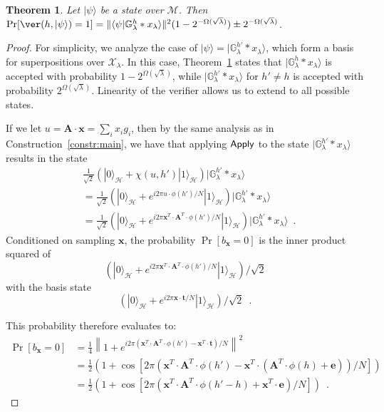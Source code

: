 \documentclass{article}\usepackage[a4paper,margin=20mm]{geometry}
\newtheorem{theorem}{Theorem}\newtheorem{lemma}[theorem]{Lemma}\newtheorem{proposition}[theorem]{Proposition}\newtheorem{corollary}[theorem]{Corollary}\newtheorem{definition}[theorem]{Definition}\newtheorem{claim}[theorem]{Claim}\newtheorem{remark}[theorem]{Remark}\newtheorem{observation}[theorem]{Observation}\newtheorem{conjecture}[theorem]{Conjecture}\newtheorem{example}[theorem]{Example}
\numberwithin{theorem}{section}
\numberwithin{equation}{section}
\newcommand{\G}{\mathbb{G}}
\newcommand{\ev}{{\mathbf{e}}}
\newcommand{\tv}{{\mathbf{t}}}
\newcommand{\xv}{{\mathbf{x}}}
\newcommand{\Am}{{\mathbf{A}}}
\newcommand{\Hs}{{\mathcal{H}}}
\newcommand{\Ms}{{\mathcal{M}}}
\newcommand{\Xs}{{\mathcal{X}}}
\begin{document}
\begin{theorem}\label{thm:rejectalternate} Let $|\psi\rangle$ be a state over $\Ms$. Then $\Pr[\ver(h,|\psi\rangle)=1]=\|\langle\psi |\G_\lambda^h*x_\lambda\rangle \|^2(1-2^{-\Omega(\sqrt{\lambda})})\pm 2^{-\Omega(\sqrt{\lambda})}$.
\end{theorem}
\begin{proof}
	For simplicity, we analyze the case of $|\psi\rangle=|\G_\lambda^{h'}*x_\lambda\rangle$, which form a basis for superpositions over $\Xs_\lambda$. In this case, Theorem~\ref{thm:rejectalternate} states that $|\G_\lambda^h*x_\lambda\rangle$ is accepted with probability $1-2^{\Omega(\sqrt{\lambda})}$, while $|\G_\lambda^{h'}*x_\lambda\rangle$ for $h'\neq h$ is accepted with probability $2^{\Omega(\sqrt{\lambda})}$. Linearity of the verifier allows us to extend to all possible states.
	
	If we let $u=\Am\cdot\xv=\sum_i x_i g_i$, then by the same analysis as in Construction~\ref{constr:main}, we have that applying ${\sf Apply}$ to the state $|\G_\lambda^{h'}*x_\lambda\rangle$ results in the state
	\begin{align*}
		&\frac{1}{\sqrt{2}}\left(|0\rangle_\Hs+\chi(u,h')|1\rangle_\Hs\right)|\G_\lambda^{h'}*x_\lambda\rangle\\
		&=\frac{1}{\sqrt{2}}\left(|0\rangle_\Hs+e^{i2\pi u\cdot\phi(h')/N}|1\rangle_\Hs\right)|\G_\lambda^{h'}*x_\lambda\rangle\\
		&=\frac{1}{\sqrt{2}}\left(|0\rangle_\Hs+e^{i2\pi \xv^T\cdot\Am^T\cdot\phi(h')/N}|1\rangle_\Hs\right)|\G_\lambda^{h'}*x_\lambda\rangle\enspace .
	\end{align*}
	Conditioned on sampling $\xv$, the probability $\Pr[b_\xv=0]$ is the inner product squared of \[\left(|0\rangle_\Hs+e^{i2\pi \xv^T\cdot\Am^T\cdot\phi(h')/N}|1\rangle_\Hs\right)/\sqrt{2}\] with the basis state \[\left(|0\rangle_\Hs+e^{i2\pi \xv\cdot\tv/N}|1\rangle_\Hs\right)/\sqrt{2}\enspace .\]
    
    This probability therefore evaluates to:
	\begin{align*}
		\Pr[b_\xv=0]&=\frac{1}{4}\left\|1+e^{i2\pi (\xv^T\cdot\Am^T\cdot\phi(h')-\xv^T\cdot\tv)/N}\right\|^2\\
		&=\frac{1}{2}\left(1+\cos\left[2\pi (\xv^T\cdot\Am^T\cdot\phi(h')-\xv^T\cdot(\Am^T\cdot\phi(h)+\ev))/N\right]\right)\\
		&=\frac{1}{2}\left(1+\cos\left[2\pi (\xv^T\cdot\Am^T\cdot\phi(h'-h)+\xv^T\cdot\ev)/N\right]\right)\enspace .
	\end{align*}
	

\end{proof}
\end{document}
